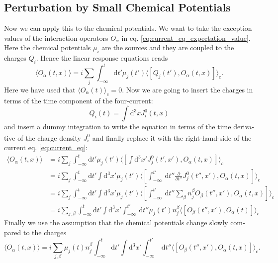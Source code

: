 \documentclass[master,       %
               twoside,        %
               BCOR10mm,       %
               english,ngerman, %
               ]{GAUBM}
\begin{document}
\begin{otherlanguage}{english}
\subsection{Perturbation by Small Chemical Potentials}
Now we can apply this to the chemical potentials.
We want to take the exception values of the interaction operators $O_\alpha$ in eq. \eqref{eq:current_eq_expectation_value}.
Here the chemical potentials $\mu_i$ are the sources and they are coupled to the charges $Q_i$.
Hence the linear response equations reads
\begin{equation}
	\langle O_\alpha(t, x) \rangle = i \sum_j \int_{-\infty}^t \mathrm{d} t' \mu_j(t') \langle [Q_j(t'), O_\alpha(t, x)] \rangle_c.
\end{equation}
Here we have used that $\langle O_\alpha(t) \rangle_c = 0$.
Now we are going to insert the charges in terms of the time component of the four-current:
\begin{equation}
	Q_i(t) = \int \mathrm{d}^3 x J^0_i(t, x)
\end{equation}
and insert a dummy integration to write the equation in terms of the time derivative of the charge density $\dot{J^0_i}$ and finally replace it with the right-hand-side of the current eq. \eqref{eq:current_eq}:
\begin{align}
	\langle O_\alpha(t, x) \rangle &= i \sum_j \int_{-\infty}^t \mathrm{d} t' \mu_j(t') \langle [\int \mathrm{d}^3 x' J^0_j(t', x'), O_\alpha(t, x)] \rangle_c \nonumber \\
	&= i \sum_j \int_{-\infty}^t \mathrm{d} t' \int \mathrm{d}^3 x'  \mu_j(t') \langle [\int^{t'}_{-\infty} \ \mathrm{d} t'' \frac{\partial}{\partial t''} J^0_j(t'', x'), O_\alpha(t, x)] \rangle_c \nonumber \\
	&= i \sum_j \int_{-\infty}^t \mathrm{d} t' \int \mathrm{d}^3 x'  \mu_j(t') \langle [\int^{t'}_{-\infty} \ \mathrm{d} t'' \sum_\beta n^\beta_j O_\beta(t'', x'), O_\alpha(t, x)] \rangle_c \nonumber \\
	&= i \sum_{j, \beta} \int_{-\infty}^t \mathrm{d} t' \int \mathrm{d}^3 x' \int^{t'}_{-\infty} \ \mathrm{d} t'' \mu_j(t') n^\beta_j \langle [ O_\beta(t'', x'), O_\alpha(t)] \rangle_c
\end{align}
Finally we use the assumption that the chemical potentials change slowly compared to the charges
\begin{equation}
	\langle O_\alpha(t, x) \rangle = i \sum_{j, \beta} \mu_j(t) n^\beta_j  \int_{-\infty}^t \mathrm{d} t' \int \mathrm{d}^3 x' \int^{t'}_{-\infty} \ \mathrm{d} t'' \langle [ O_\beta(t'', x'), O_\alpha(t, x)] \rangle_c.

\end{equation}
\end{otherlanguage}
\end{document}
